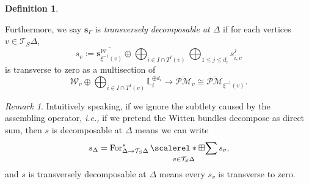 \documentclass[11pt]{amsart}
\theoremstyle{definition}
\newtheorem{dfn}[dummy]{Definition}
\theoremstyle{remark}
\newtheorem{rmk}[dummy]{Remark}
\newcommand{\oPMb}{{\overline{\mathcal{PM}}}}
\newcommand{\<}{\left<}
\renewcommand{\>}{\right>}
\numberwithin{equation}{section}
\DeclareMathOperator*{\bboxplus}{\scalerel*{\boxplus}{\sum}}
\begin{document}
\begin{dfn}
\begin{itemize}
    \end{itemize}
    Furthermore, we say  $\bm{s}_{\Gamma}$ is \textit{transversely decomposable at $\Delta$} if for each vertices $v\in \mathcal T_S \Delta$, 
    $$
    s_v:=\overline{\bm{s}_{\xi^{-1}(v)}^{\mathcal W}} \oplus \bigoplus_{i\in I \cap T^I(v)}\bigoplus_{1\le j \le d_i} s^j_{i,v}
    $$
    is transverse to zero as a multisection of 
    $$\mathcal W_{v}\oplus \bigoplus_{i\in I \cap T^I(v)}\mathbb L_i^{\oplus d_i}\to \oPMb_v\cong \oPMb_{\xi^{-1}(v)}.$$
    
    \end{dfn}

    \begin{rmk}
        Intuitively speaking, if we ignore the subtlety caused by the assembling operator, \textit{i.e.,} if we pretend the Witten bundles decompose as direct sum, then $s$ is decomposable at $\Delta$ means we can write
        $$
        s_\Delta=\operatorname{For}^*_{\Delta \to  \mathcal T_S \Delta}\bboxplus_{v\in \mathcal T_S \Delta} s_v,
        $$
        and  $s$ is transversely decomposable at $\Delta$ means every $s_v$ is transverse to zero.
        
    \end{rmk}


    
\end{document}
